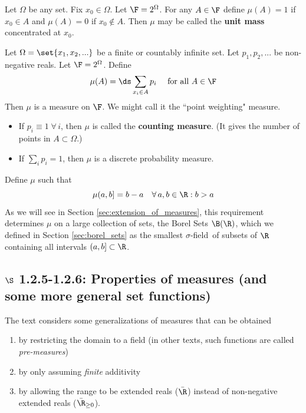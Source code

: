 \documentclass{article} %
\renewcommand{\sf}{$\sigma$-field}
\begin{document}
\begin{example}
Let $\Omega$ be any set.  Fix $x_0 \in \Omega$.  Let $\F = 2^\Omega$.  For any $A \in \F$ define $\mu(A) = 1$ if $x_0 \in A$ and $\mu(A) = 0$ if $x_0 \not\in A$.  Then $\mu$ may be called the \textbf{unit mass} concentrated at $x_0$.
\end{example}

\begin{example}
Let $\Omega = \set{x_1,x_2,...}$ be a finite or countably infinite set.  Let $p_1, p_2,...$ be non-negative reals.  Let $\F = 2^\Omega$.  Define
\[\mu(A) = \ds\sum_{x_i \in A} p_i \quad \text{ for all } A \in \F\]
Then $\mu$ is a measure on $\F$. We might call it the ``point weighting" measure. 
\begin{itemize}
\item If $p_i \equiv 1 \; \forall \, i$, then $\mu$ is called the \textbf{counting measure}. (It gives the number of points in $A \subset \Omega$.)
\item If $\sum_i p_i =1$, then $\mu$ is a discrete probability measure.	
\end{itemize}
	
\end{example}


\begin{example}{}
Define $\mu$ such that 
\[ \mu(a,b] = b-a \quad \forall \, a,b \in \R : b>a \]
As we will see in Section \ref{sec:extension_of_measures}, this requirement determines $\mu$ on a large collection of sets, the Borel Sets $\B(\R)$, which we defined in Section \ref{sec:borel_sets} as the smallest \sf\ of subsets of $\R$ containing all intervals $(a,b] \subset \R$. 
\label{ex:Lebesgue_measure}
\end{example}


\subsection{$\S$ 1.2.5-1.2.6: Properties of measures (and some more general set functions)}

The text considers some generalizations of measures that can be obtained
\begin{enumerate}
\item  by restricting the domain to a field {\footnotesize (in other texts, such functions are called \textit{pre-measures}) }
\item  by only assuming \textit{finite} additivity 
\item by allowing the range to be extended reals ($\bar{\R}$) instead of non-negative extended reals ($\bar{\R}_{\geq 0}$).  
\end{enumerate}
\end{document}
